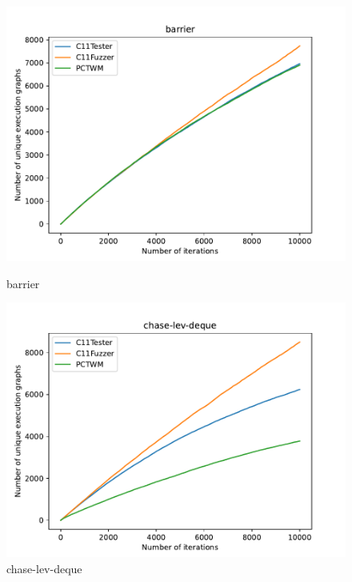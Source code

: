 \begin{figure}[H]
	\centering

	\begin{minipage}{0.45\textwidth}
		\centering
		\includegraphics[width=\textwidth]{figure/pctwm/barrier.pdf}
		\caption{barrier}
		\label{pctwm-barrier}
	\end{minipage}
	\hfill
	\begin{minipage}{0.45\textwidth}
		\centering
		\includegraphics[width=\textwidth]{figure/pctwm/chase-lev-deque.pdf}
		\caption{chase-lev-deque}
		\label{pctwm-chase-lev-deque}
	\end{minipage}
	\vspace{0.5cm}


\end{figure}
